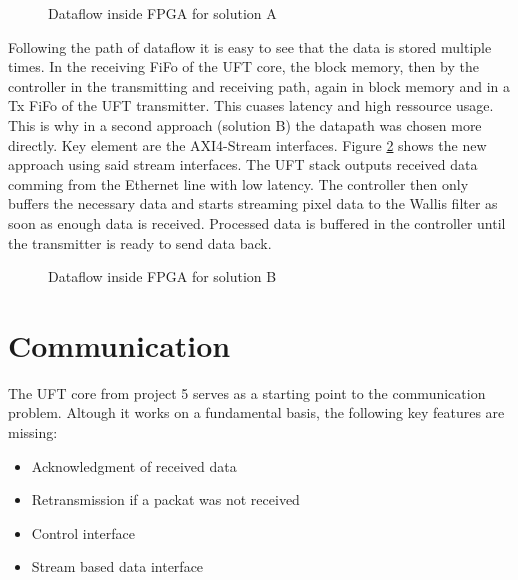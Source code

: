\begin{figure}[t!]
    \centering
    \begin{adjustbox}{max width=\textwidth}
        
    \end{adjustbox}
    \caption{Dataflow inside FPGA for solution A}
    \label{fig:dataflowa}
\end{figure}

Following the path of dataflow it is easy to see that the data is stored
multiple
times. In the receiving FiFo of the UFT core, the block memory, then by the
controller in the transmitting and receiving path, again in block memory and in
a Tx FiFo of the UFT transmitter. This cuases latency and high ressource usage.
This is why in a second approach (solution B) the datapath was chosen more
directly. Key element are the AXI4-Stream interfaces. Figure \ref{fig:dataflowb}
shows the new approach using said stream interfaces. The UFT stack outputs
received data comming from the Ethernet line with low latency. The controller
then only buffers the necessary data and starts streaming pixel data to the
Wallis filter as soon as enough data is received. Processed data is buffered in
the controller until the transmitter is ready to send data back.

\begin{figure}[b!]
    \centering
    \begin{adjustbox}{max width=\textwidth}
        
    \end{adjustbox}
    \caption{Dataflow inside FPGA for solution B}
    \label{fig:dataflowb}
\end{figure}

\section{Communication}
The UFT core from project 5 serves as a starting point to the communication
problem. Altough it works on a fundamental basis, the following key features are
missing:

\begin{itemize}
	\item Acknowledgment of received data
	\item Retransmission if a packat was not received
	\item Control interface
	\item Stream based data interface
\end{itemize}

